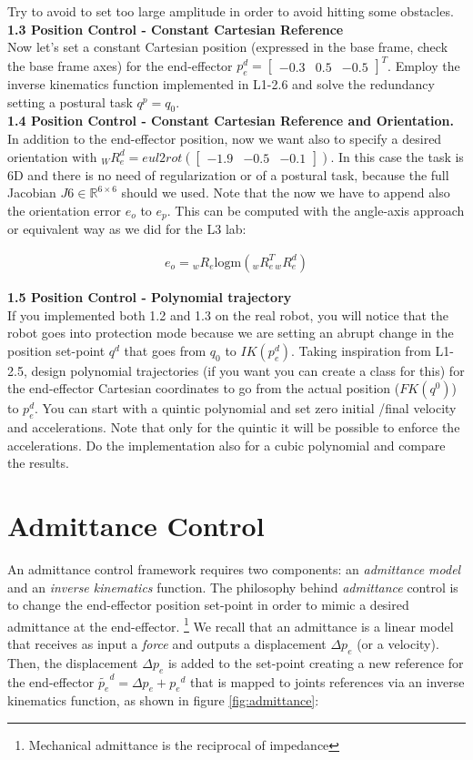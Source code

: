 \documentclass[11pt]{article}
\newcommand{\Rnum}{\mathbb{R}} %
\newcommand{\mat}[1]{\ensuremath{\begin{bmatrix}#1\end{bmatrix}}}	%
\begin{document}
 Try to avoid to set too large amplitude in order to avoid hitting some obstacles. \\

\textbf{1.3 Position Control - Constant Cartesian Reference}\\
Now let's set a constant Cartesian position (expressed in the base frame, check the base frame axes) 
for the end-effector $p_e^d=\mat{-0.3&  0.5& -0.5}^T   $. Employ the inverse kinematics function implemented in L1-2.6 and solve the redundancy  setting a postural task $q^p = q_0$.\\

\textbf{1.4 Position Control - Constant Cartesian Reference and Orientation.}\\
In addition to the end-effector position, now we want also to specify a desired orientation with ${}_WR_e^d = eul2rot(\mat{-1.9& -0.5& -0.1})$.
In this case the task is 6D and there is no need of regularization or of a postural task, because the full Jacobian $J6 \in \Rnum^{6 \times 6}$ should we used. 
Note that the now we have to append also  the orientation error $e_o$  to $e_p$. This can be computed with the angle-axis approach or equivalent way as we did for the L3 lab: 

\begin{align}
e_o = {}_wR_e \text{logm}({}_wR_e^T {}_wR_e^d)
\end{align}


\textbf{1.5 Position Control - Polynomial trajectory}\\
If you implemented both 1.2 and 1.3 on the real robot, you will notice that the robot goes into protection mode because we are setting an abrupt change in the position set-point $q^d$ that goes from $q_0$ to $IK(p_e^d)$.
Taking inspiration from L1-2.5, design polynomial  trajectories (if you want you can create a class for this) for the end-effector Cartesian coordinates to go from the actual position ($FK(q^0)$) to $p_e^d$. You can start with a quintic polynomial and set zero initial /final velocity and accelerations. Note that only for the quintic it will be possible to enforce the accelerations. Do the implementation also for a cubic polynomial and compare the results.\\


\section{Admittance Control}
An admittance control framework requires two components: an \textit{admittance model} and an \textit{inverse kinematics} function.
The philosophy behind \textit{admittance} control is to change the end-effector position set-point in order to mimic a desired admittance at the end-effector. 
\footnote{Mechanical admittance is the reciprocal of impedance} We recall that an admittance is a linear model that receives  as input a \textit{force} and 
outputs a displacement $\Delta p_e$ (or a velocity). Then, the displacement $\Delta p_e$ is added to the set-point creating a new reference for the end-effector $\tilde{p_e}^d = \Delta p_e + {p_e}^d$  that is mapped to joints references via an inverse kinematics function, as shown in figure \ref{fig:admittance}:\\
\end{document}
